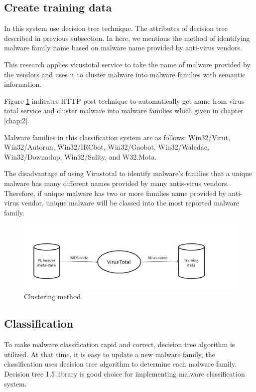 \subsection{Create training data}

In this system use decision tree technique. The attributes of decision tree described in previous subsection. In here, we mentions the method of identifying malware family name based on malware name provided by anti-virus vendors.

This research applies virustotal service to take the name of malware provided by the vendors and uses it to cluster malware into malware families with semantic information.

Figure \ref{fig:clustering} indicates HTTP post technique to automatically get name from virus total service and cluster malware into malware families which given in chapter \ref{chap:2}.

Malware families in this classification system are as follows: Win32/Virut, Win32/Autorun, Win32/IRCbot, Win32/Gaobot, Win32/Waledac, Win32/Downadup, Win32/Sality, and W32.Mota. 

The disadvantage of using Virustotal to identify malware's families that a unique malware has many different names provided by many antis-virus vendors. Therefore, if unique malware has two or more families name provided by anti-virus vendor, unique malware will be classed into the most reported malware family.
\begin{figure}[h!]
\centering
\includegraphics[width=1\textwidth]{graph/clustering.jpg}
\caption{Clustering method.}
\label{fig:clustering}
\end{figure}

\subsection{Classification}

To make malware classification rapid and correct, decision tree algorithm is utilized. At that time, it is easy to update a new malware family, the classification uses decision tree algorithm to determine each malware family. 
Decision tree 1.5 library is good choice for implementing malware classification system.  

